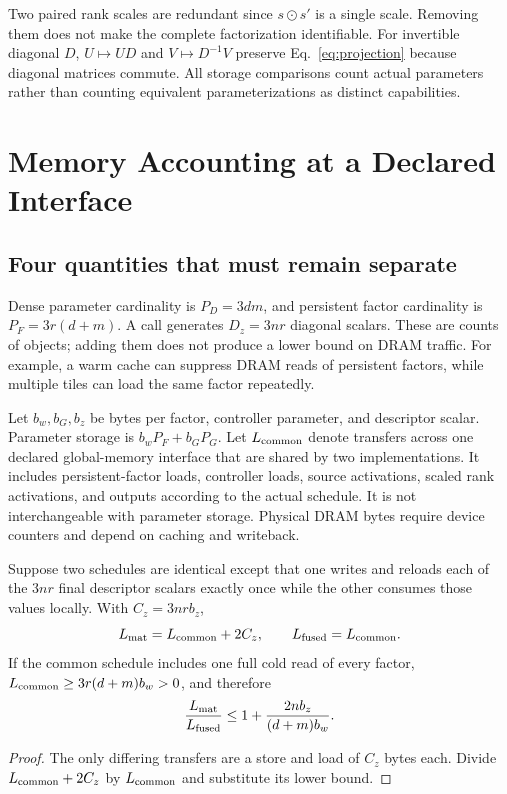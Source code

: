 Two paired rank scales are redundant since $s\odot s'$ is a single scale.
Removing them does not make the complete factorization identifiable. For
invertible diagonal $D$, $U\mapsto UD$ and $V\mapsto D^{-1}V$ preserve
Eq.~\eqref{eq:projection} because diagonal matrices commute. All storage
comparisons count actual parameters rather than counting equivalent
parameterizations as distinct capabilities.

\section{Memory Accounting at a Declared Interface}
\subsection{Four quantities that must remain separate}
Dense parameter cardinality is $P_D=3dm$, and persistent factor cardinality
is $P_F=3r(d+m)$. A call generates $D_z=3nr$ diagonal scalars. These are
counts of objects; adding them does not produce a lower bound on DRAM traffic.
For example, a warm cache can suppress DRAM reads of persistent factors, while
multiple tiles can load the same factor repeatedly.

Let $b_w,b_G,b_z$ be bytes per factor, controller parameter, and descriptor
scalar. Parameter storage is $b_wP_F+b_GP_G$. Let $L_{\rm common}$ denote
transfers across one declared global-memory interface that are shared by two
implementations. It includes persistent-factor loads, controller loads,
source activations, scaled rank activations, and outputs according to the
actual schedule. It is not interchangeable with parameter storage. Physical
DRAM bytes require device counters and depend on caching and writeback.

\begin{proposition}\label{prop:bytes}
Suppose two schedules are identical except that one writes and reloads each
of the $3nr$ final descriptor scalars exactly once while the other consumes
those values locally. With $C_z=3nrb_z$,
\begin{equation}
 L_{\rm mat}=L_{\rm common}+2C_z,\qquad
 L_{\rm fused}=L_{\rm common}.\label{eq:bytes}
\end{equation}
If the common schedule includes one full cold read of every factor,
$L_{\rm common}\ge3r(d+m)b_w>0$, and therefore
\begin{equation}
 \frac{L_{\rm mat}}{L_{\rm fused}}
 \le1+\frac{2n b_z}{(d+m)b_w}.\label{eq:byte-ceiling}
\end{equation}
\end{proposition}
\begin{proof}
The only differing transfers are a store and load of $C_z$ bytes each.
Divide $L_{\rm common}+2C_z$ by $L_{\rm common}$ and substitute its lower bound.
\end{proof}

